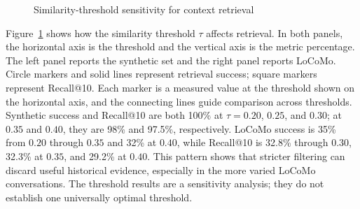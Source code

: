 \begin{figure}[H]
\centering
{}
\caption{Similarity-threshold sensitivity for context retrieval}
\label{fig:context-thresholds}
\end{figure}

Figure~\ref{fig:context-thresholds} shows how the similarity threshold $\tau$ affects retrieval. In both panels, the horizontal axis is the threshold and the vertical axis is the metric percentage. The left panel reports the synthetic set and the right panel reports LoCoMo. Circle markers and solid lines represent retrieval success; square markers represent Recall@10. Each marker is a measured value at the threshold shown on the horizontal axis, and the connecting lines guide comparison across thresholds. Synthetic success and Recall@10 are both 100\% at $\tau=0.20$, $0.25$, and $0.30$; at $0.35$ and $0.40$, they are 98\% and 97.5\%, respectively. LoCoMo success is 35\% from $0.20$ through $0.35$ and 32\% at $0.40$, while Recall@10 is 32.8\% through $0.30$, 32.3\% at $0.35$, and 29.2\% at $0.40$. This pattern shows that stricter filtering can discard useful historical evidence, especially in the more varied LoCoMo conversations. The threshold results are a sensitivity analysis; they do not establish one universally optimal threshold.
